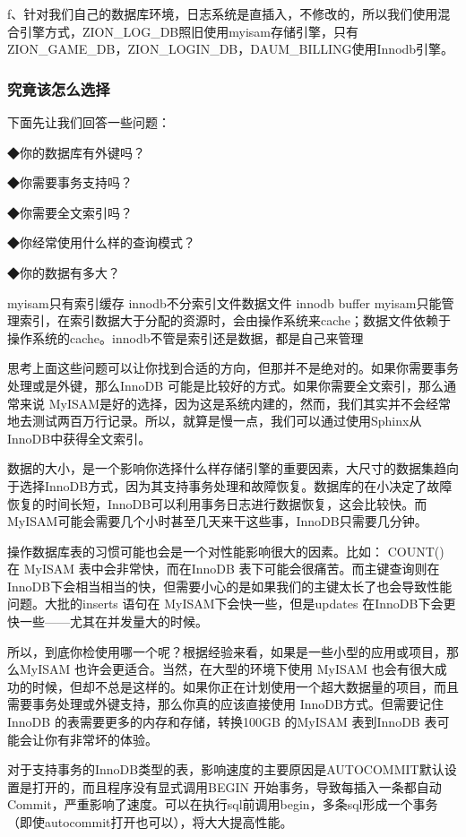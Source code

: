 \documentclass[UTF8]{ctexart}
\begin{document}
f、针对我们自己的数据库环境，日志系统是直插入，不修改的，所以我们使用混合引擎方式，ZION\_LOG\_DB照旧使用myisam存储引擎，只有ZION\_GAME\_DB，ZION\_LOGIN\_DB，DAUM\_BILLING使用Innodb引擎。

\subsubsection{究竟该怎么选择}

下面先让我们回答一些问题：   

◆你的数据库有外键吗？   

◆你需要事务支持吗？   

◆你需要全文索引吗？   

◆你经常使用什么样的查询模式？   

◆你的数据有多大？   
  
myisam只有索引缓存   
innodb不分索引文件数据文件 innodb buffer   
myisam只能管理索引，在索引数据大于分配的资源时，会由操作系统来cache；数据文件依赖于操作系统的cache。innodb不管是索引还是数据，都是自己来管理  
  
思考上面这些问题可以让你找到合适的方向，但那并不是绝对的。如果你需要事务处理或是外键，那么InnoDB 可能是比较好的方式。如果你需要全文索引，那么通常来说 MyISAM是好的选择，因为这是系统内建的，然而，我们其实并不会经常地去测试两百万行记录。所以，就算是慢一点，我们可以通过使用Sphinx从InnoDB中获得全文索引。  
  
数据的大小，是一个影响你选择什么样存储引擎的重要因素，大尺寸的数据集趋向于选择InnoDB方式，因为其支持事务处理和故障恢复。数据库的在小决定了故障恢复的时间长短，InnoDB可以利用事务日志进行数据恢复，这会比较快。而MyISAM可能会需要几个小时甚至几天来干这些事，InnoDB只需要几分钟。  
  
操作数据库表的习惯可能也会是一个对性能影响很大的因素。比如： COUNT() 在 MyISAM 表中会非常快，而在InnoDB 表下可能会很痛苦。而主键查询则在InnoDB下会相当相当的快，但需要小心的是如果我们的主键太长了也会导致性能问题。大批的inserts 语句在 MyISAM下会快一些，但是updates 在InnoDB下会更快一些——尤其在并发量大的时候。  
  
所以，到底你检使用哪一个呢？根据经验来看，如果是一些小型的应用或项目，那么MyISAM 也许会更适合。当然，在大型的环境下使用 MyISAM 也会有很大成功的时候，但却不总是这样的。如果你正在计划使用一个超大数据量的项目，而且需要事务处理或外键支持，那么你真的应该直接使用 InnoDB方式。但需要记住InnoDB 的表需要更多的内存和存储，转换100GB 的MyISAM 表到InnoDB 表可能会让你有非常坏的体验。  
  
对于支持事务的InnoDB类型的表，影响速度的主要原因是AUTOCOMMIT默认设置是打开的，而且程序没有显式调用BEGIN 开始事务，导致每插入一条都自动Commit，严重影响了速度。可以在执行sql前调用begin，多条sql形成一个事务（即使autocommit打开也可以），将大大提高性能。  
\end{document}
